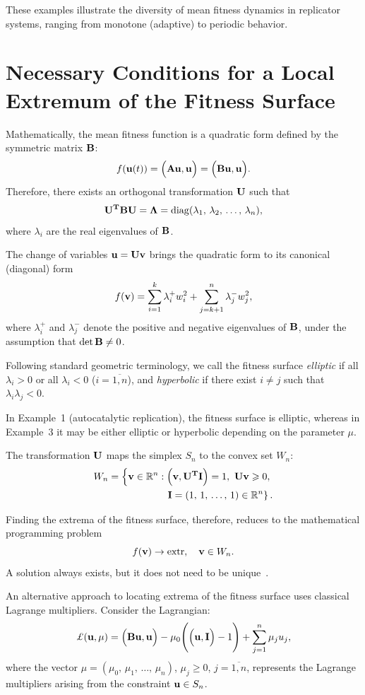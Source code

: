 \documentclass[12pt]{report}
\newcommand{\R}{\mathbb{R}}
\DeclareMathOperator{\diag}{diag}
\theoremstyle{definition}
\theoremstyle{remark}
\begin{document}
These examples illustrate the diversity of mean fitness dynamics in replicator systems, ranging from monotone (adaptive) to periodic behavior.

\clearpage

\section{Necessary Conditions for a Local Extremum of the Fitness Surface}\label{c2:section:2.2}
Mathematically, the mean fitness function is a quadratic form defined by the symmetric matrix ${\bf B}$:
$$
f({\bf u}(t)) = \Big({\bf Au, u}\Big) = \Big({\bf Bu, u}\Big). 
$$ 
Therefore, there exists an orthogonal transformation ${\bf U}$ such that
$$
{\bf U^{T}BU} = {\bf \Lambda} = \diag(\lambda_{1},\, \lambda_{2},\, \ldots,\, \lambda_{n}),
$$
where $\lambda_{i}$ are the real eigenvalues of ${\bf B}$.

The change of variables ${\bf u = Uv}$ brings the quadratic form to its canonical (diagonal) form
$$
f({\bf v}) = \sum\limits_{i = 1}^{k}\lambda_{i}^{+}w_{i}^{2} + \sum\limits_{j = k + 1}^{n}\lambda_{j}^{-}w_{j}^{2},
$$
where $\lambda_{i}^{+}$ and $\lambda_{j}^{-}$ denote the positive and negative eigenvalues of ${\bf B}$, under the assumption that $\det{\bf B} \neq 0$.

Following standard geometric terminology, we call the fitness surface \textit{elliptic} if all $\lambda_{i} > 0$ or all $\lambda_{i} < 0$ (${i = \overline{1, n}}$), and \textit{hyperbolic} if there exist $i \neq j$ such that $\lambda_{i}\lambda_{j} < 0$.

In Example~1 (autocatalytic replication), the fitness surface is elliptic, whereas in Example~3 it may be either elliptic or hyperbolic depending on the parameter $\mu$.

The transformation ${\bf U}$ maps the simplex $S_{n}$ to the convex set $W_{n}$:
\begin{align*}
	W_{n} = \left\{{\bf v} \in \mathbb{R}^{n}: \Big({\bf v, U^{T}I}\Big) = 1,\,\, {\bf Uv} \geqslant 0, \right. \\
    \left. {\bf I} = (1,\, 1,\, \ldots,\, 1) \in \R^{n}\right\}.
\end{align*}

Finding the extrema of the fitness surface, therefore, reduces to the mathematical programming problem
$$
f({\bf v}) \to {\rm extr}, \quad {\bf v} \in W_{n}.
$$
A solution always exists, but it does not need to be unique~\cite{c2:Ioffe1974}.

An alternative approach to locating extrema of the fitness surface uses classical Lagrange multipliers. Consider the Lagrangian:
$$
\pounds({\bf u}, \mu) = \Big({\bf Bu, u}\Big) - \mu_{0}\Bigg(\Big({\bf u, I}\Big) - 1\Bigg) + \sum\limits_{j = 1}^{n}\mu_{j}u_{j},
$$ 
where the vector $\mu = (\mu_{0},\, \mu_{1},\, \ldots,\, \mu_{n})$, $\mu_{j} \geqslant 0$, $j = \overline{1, n}$, represents the Lagrange multipliers arising from the constraint ${\bf u} \in S_{n}$.
\end{document}

